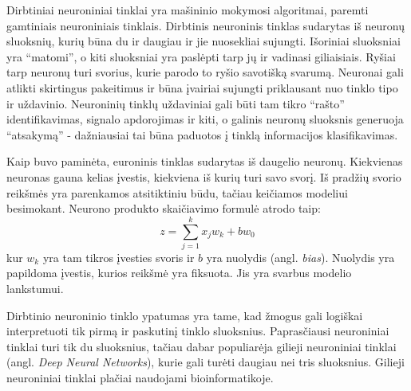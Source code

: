 Dirbtiniai neuroniniai tinklai yra mašininio mokymosi algoritmai, paremti gamtiniais neuroniniais tinklais.\cite{ragoza_proteinligand_2017} Dirbtinis neuroninis tinklas sudarytas iš neuronų sluoksnių, kurių būna du ir daugiau ir jie nuosekliai sujungti. Išoriniai sluoksniai yra \enquote{matomi}, o kiti sluoksniai yra paslėpti tarp jų ir vadinasi giliaisiais.\cite{schmidhuber_deep_2015} Ryšiai tarp neuronų turi svorius, kurie parodo to ryšio savotišką svarumą. Neuronai gali atlikti skirtingus pakeitimus ir būna įvairiai sujungti priklausant nuo tinklo tipo ir uždavinio. Neuroninių tinklų uždaviniai gali būti tam tikro \enquote{rašto} identifikavimas, signalo apdorojimas ir kiti, o galinis neuronų sluoksnis generuoja \enquote{atsakymą} - dažniausiai tai būna paduotos į tinklą informacijos klasifikavimas.\cite{ragoza_proteinligand_2017}

Kaip buvo paminėta, euroninis tinklas sudarytas iš daugelio neuronų. Kiekvienas neuronas gauna kelias įvestis, kiekviena iš kurių turi savo svorį. Iš pradžių svorio reikšmės yra parenkamos atsitiktiniu būdu, tačiau keičiamos modeliui besimokant. Neurono produkto skaičiavimo formulė atrodo taip:
\begin{equation}
z=\sum_{j=1}^{k} x_{j} w_{k}+b w_{0}
\end{equation}
kur $w_k$ yra tam tikros įvesties svoris ir $b$ yra nuolydis (angl. \textit{bias}). Nuolydis yra papildoma įvestis, kurios reikšmė yra fiksuota. Jis yra svarbus modelio lankstumui.

Dirbtinio neuroninio tinklo ypatumas yra tame, kad žmogus gali logiškai interpretuoti tik pirmą ir paskutinį tinklo sluoksnius. Paprasčiausi neuroniniai tinklai turi tik du sluoksnius, tačiau dabar populiarėja gilieji neuroniniai tinklai (angl. \textit{Deep Neural Networks}), kurie gali turėti daugiau nei tris sluoksnius. %
Gilieji neuroniniai tinklai plačiai naudojami bioinformatikoje.\cite{chen_hidden_2019}\cite{stepniewska-dziubinska_development_2018}

